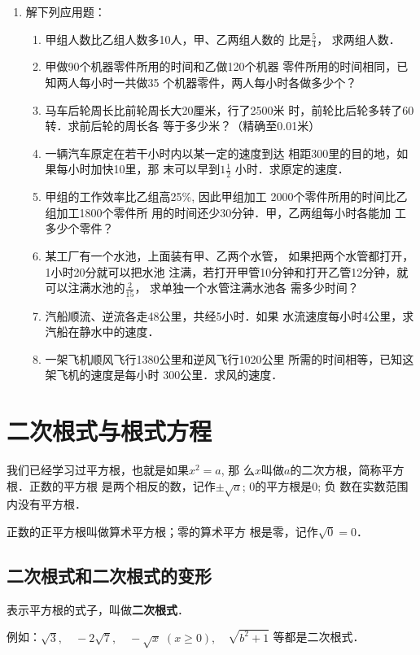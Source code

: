 \begin{enumerate}
\item 解下列应用题：
\begin{enumerate}
\item 甲组人数比乙组人数多10人，甲、乙两组人数的
比是$\frac{5}{4}$，
求两组人数．
\item 甲做90个机器零件所用的时间和乙做120个机器
零件所用的时间相同，已知两人每小时一共做35
个机器零件，两人每小时各做多少个？
\item 马车后轮周长比前轮周长大20厘米，行了2500米
时，前轮比后轮多转了60转．求前后轮的周长各
等于多少米？（精确至0.01米）
\item 一辆汽车原定在若干小时内以某一定的速度到达
相距300里的目的地，如果每小时加快10里，那
末可以早到$1\frac{1}{2}$
小时．求原定的速度．
\item 甲组的工作效率比乙组高25\%, 因此甲组加工
2000个零件所用的时间比乙组加工1800个零件所
用的时间还少30分钟．甲，乙两组每小时各能加
工多少个零件？
\item 某工厂有一个水池，上面装有甲、乙两个水管，
如果把两个水管都打开，1小时20分就可以把水池
注满，若打开甲管10分钟和打开乙管12分钟，就
可以注满水池的$\frac{2}{15}$，
求单独一个水管注满水池各
需多少时间？
\item 汽船顺流、逆流各走48公里，共经5小时．如果
水流速度每小时4公里，求汽船在静水中的速度．
\item 一架飞机顺风飞行1380公里和逆风飞行1020公里
所需的时间相等，已知这架飞机的速度是每小时
300公里．求风的速度．
\end{enumerate}
\end{enumerate}

\section{二次根式与根式方程}
我们已经学习过平方根，也就是如果$x^2=a$, 那
么$x$叫做$a$的二次方根，简称平方根．正数的平方根
是两个相反的数，记作$\pm\sqrt{a}$; 0的平方根是0; 负
数在实数范围内没有平方根．

正数的正平方根叫做算术平方根；零的算术平方
根是零，记作$\sqrt{0}=0$．

\subsection{二次根式和二次根式的变形}
表示平方根的式子，叫做\textbf{二次根式}．

例如：$\sqrt{3},\quad -2\sqrt{7},\quad -\sqrt{x}\; (x\ge 0),\quad \sqrt{b^2+1}$
等都是二次根式．

